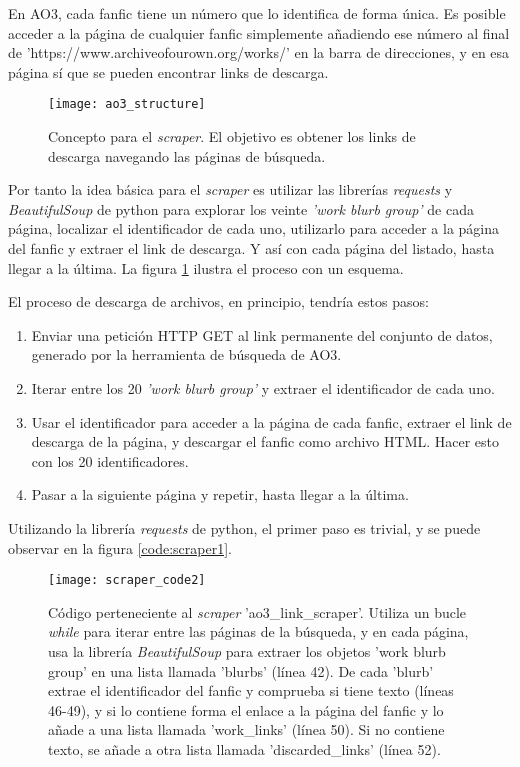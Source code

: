 \documentclass{pre-tfg}
\begin{document}
En AO3, cada fanfic tiene un número que lo identifica de forma única. Es posible acceder a la página de cualquier fanfic simplemente añadiendo ese número al final de \newline 'https://www.archiveofourown.org/works/' en la barra de direcciones, y en esa página sí que se pueden encontrar links de descarga.

\begin{figure}[h]
	\texttt{[image: ao3\_structure]}
	\caption{Concepto para el \textit{scraper}. El objetivo es obtener los links de descarga navegando las páginas de búsqueda.}
	\label{fig:ao3_structure}
	\centering
\end{figure}

Por tanto la idea básica para el \textit{scraper} es utilizar las librerías \textit{requests} y \textit{BeautifulSoup} de python para explorar los veinte \textit{'work blurb group'} de cada página, localizar el identificador de cada uno, utilizarlo para acceder a la página del fanfic y extraer el link de descarga. Y así con cada página del listado, hasta llegar a la última. La figura \ref{fig:ao3_structure} ilustra el proceso con un esquema.

El proceso de descarga de archivos, en principio, tendría estos pasos:

\begin{enumerate}
	\item Enviar una petición HTTP GET al link permanente del conjunto de datos, generado por la herramienta de búsqueda de AO3.
	\item Iterar entre los 20 \textit{'work blurb group'} y extraer el identificador de cada uno.
	\item Usar el identificador para acceder a la página de cada fanfic, extraer el link de descarga de la página, y descargar el fanfic como archivo HTML. Hacer esto con los 20 identificadores.
	\item Pasar a la siguiente página y repetir, hasta llegar a la última.
\end{enumerate}

Utilizando la librería \textit{requests} de python, el primer paso es trivial, y se puede observar en la figura \ref{code:scraper1}.

\begin{figure}
	\texttt{[image: scraper\_code2]}
	\caption{Código perteneciente al \textit{scraper} 'ao3\_link\_scraper'. Utiliza un bucle \textit{while} para iterar entre las páginas de la búsqueda, y en cada página, usa la librería \textit{BeautifulSoup} para extraer los objetos 'work blurb group' en una lista llamada 'blurbs' (línea 42). De cada 'blurb' extrae el identificador del fanfic y comprueba si tiene texto (líneas 46-49), y si lo contiene forma el enlace a la página del fanfic y lo añade a una lista llamada 'work\_links' (línea 50). Si no contiene texto, se añade a otra lista llamada 'discarded\_links' (línea 52).}
	\label{code:scraper2}
\end{figure}
\end{document}
